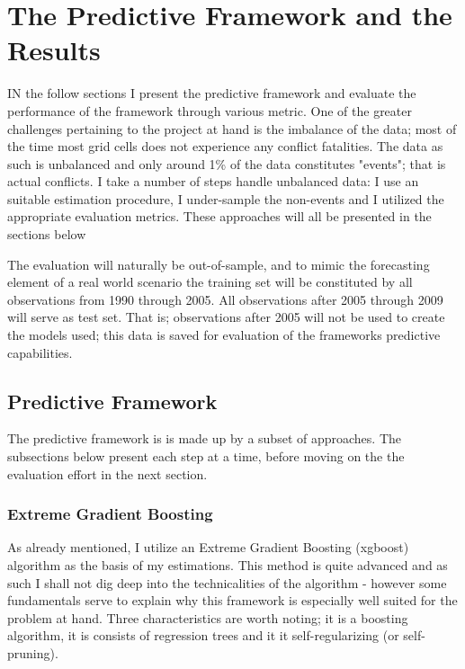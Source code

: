 \documentclass[a4paper]{article}
\begin{document}

\section{The Predictive Framework and the Results}

IN the follow sections I present the predictive framework and evaluate the performance of the framework through various metric. One of the greater challenges pertaining to the project at hand is the imbalance of the data;  most of the time most grid cells does not experience any conflict fatalities. The data as such is unbalanced and only around 1\% of the data constitutes "events"; that is actual conflicts. I take a number of steps handle unbalanced data: I use an suitable estimation procedure, I under-sample the non-events and I utilized the appropriate evaluation metrics. These approaches will all be presented in the sections below\par

The evaluation will naturally be out-of-sample, and to mimic the forecasting element of a real world scenario the training set will be constituted by all observations from 1990 through 2005. All observations after 2005 through 2009 will serve as test set. That is; observations after 2005 will not be used to create the models used; this data is saved for evaluation of the frameworks predictive capabilities.\par

\subsection{Predictive Framework}

The predictive framework is is made up by a subset of approaches. The subsections below present each step at a time, before moving on the the evaluation effort in the next section.\par

\subsubsection{Extreme Gradient Boosting}

As already mentioned, I utilize an Extreme Gradient Boosting (xgboost) algorithm as the basis of my estimations. This method is quite advanced and as such I shall not dig deep into the technicalities of the algorithm - however some fundamentals serve to explain why this framework is especially well suited for the problem at hand. Three characteristics are worth noting; it is a boosting algorithm, it is consists of regression trees and it it self-regularizing (or self-pruning).
\end{document}
